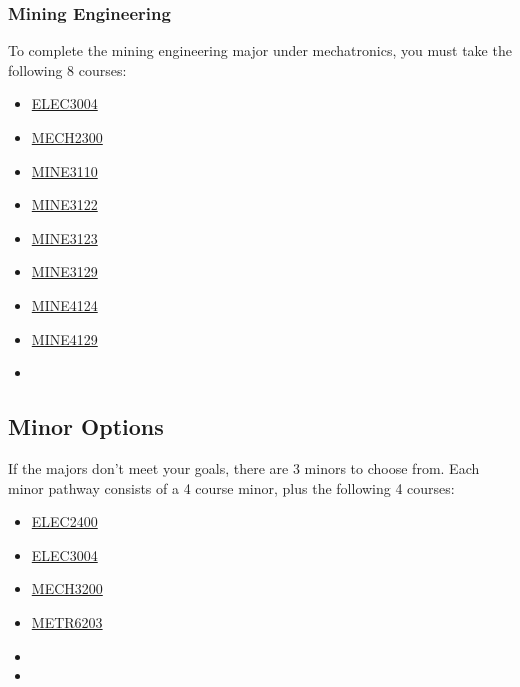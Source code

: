 \documentclass[a4paper,12pt]{report}
\begin{document}
\subsubsection{Mining Engineering}
To complete the mining engineering major under mechatronics, you must take the following 8 courses:
\begin{multicols}{3}
    \begin{itemize}
        \item \hyperlink{ELEC3004}{ELEC3004}
        \item \hyperlink{MECH2300}{MECH2300}
        \item \hyperlink{MINE3110}{MINE3110}
        \item \hyperlink{MINE3122}{MINE3122}
        \item \hyperlink{MINE3123}{MINE3123}
        \item \hyperlink{MINE3129}{MINE3129}
        \item \hyperlink{MINE4124}{MINE4124}
        \item \hyperlink{MINE4129}{MINE4129}
        \item[]
    \end{itemize}
\end{multicols}

\subsection{Minor Options}
If the majors don't meet your goals, there are 3 minors to choose from. Each minor pathway consists of a 4 course minor, plus the following 4 courses:
\begin{multicols}{3}
    \begin{itemize}
        \item \hyperlink{ELEC2400}{ELEC2400}
        \item \hyperlink{ELEC3004}{ELEC3004}
        \item \hyperlink{MECH3200}{MECH3200}
        \item \hyperlink{METR6203}{METR6203}
        \item[]
        \item[]
    \end{itemize}
\end{multicols}
\end{document}
